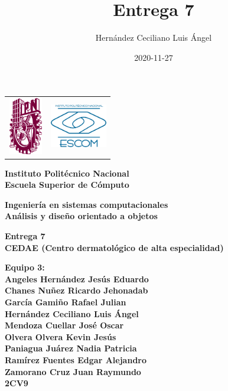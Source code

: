 \documentclass[12pt,letterpaper]{article}
\author{Hern\'andez Ceciliano Luis \'Angel}
\title{Entrega 7}
\date {2020-11-27}
\begin{document}
	\pagestyle{plain}
	{

		{
			\begin{tabular}
				{
					p{} 
					p{} 
				}
				\includegraphics[width=1.5cm, height=2.5cm]{ipn.png} &  
				\includegraphics[width=2.5cm, height=2cm]{escom.png}
			\end{tabular}
		}

		\begin{center}

			\par\vspace{1cm} %
			{
				\Huge\textbf
				{
					Instituto Polit\'ecnico Nacional 
					\\[.2cm]Escuela Superior de C\'omputo
				}
			}

			\par\vspace{0.5cm}
			{
				\large\textbf
				{
					Ingenier\'ia en sistemas computacionales 
					\\[.5cm]An\'alisis y diseño orientado a objetos
				}
			}

			\vfill

			\par\vspace{0.7cm}
			{
				\textbf
				{
					Entrega 7 \\
                    CEDAE (Centro dermatológico de alta especialidad)
				}
			}

			\vfill

			\par\vspace{0.7cm}
			{
				\textbf
				{
                    Equipo 3:
                    \\Angeles Hernández Jesús Eduardo
                    \\Chanes Nuñez Ricardo Jehonadab
                    \\García Gamiño Rafael Julian
                    \\Hernández Ceciliano Luis Ángel
                    \\Mendoza Cuellar José Oscar
                    \\Olvera Olvera Kevin Jesús
                    \\Paniagua Juárez Nadia Patricia
                    \\Ramírez Fuentes Edgar Alejandro
                    \\Zamorano Cruz Juan Raymundo
					\\2CV9
				} 
			}


\end{center}}
\end{document}
